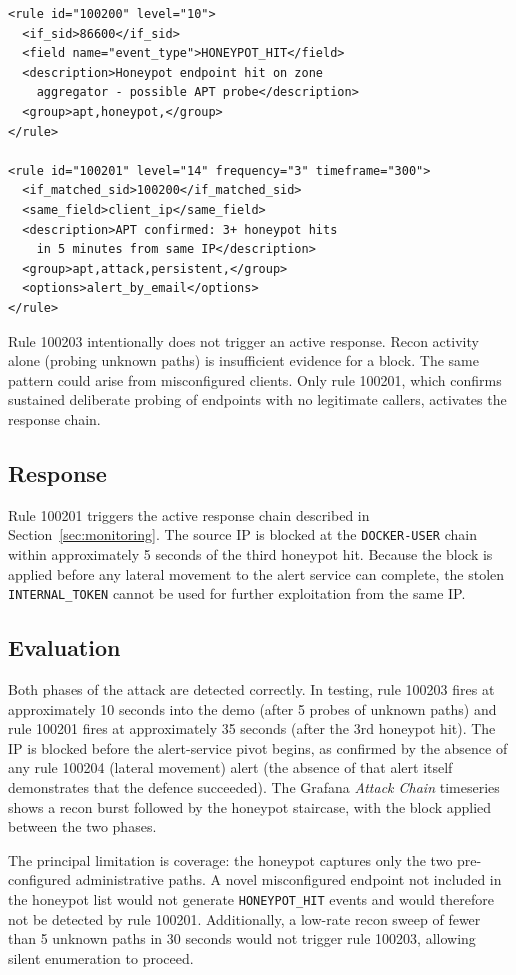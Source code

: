 \begin{lstlisting}[style=xmlstyle, caption={Wazuh rules for APT honeypot detection.}]
<rule id="100200" level="10">
  <if_sid>86600</if_sid>
  <field name="event_type">HONEYPOT_HIT</field>
  <description>Honeypot endpoint hit on zone
    aggregator - possible APT probe</description>
  <group>apt,honeypot,</group>
</rule>

<rule id="100201" level="14" frequency="3" timeframe="300">
  <if_matched_sid>100200</if_matched_sid>
  <same_field>client_ip</same_field>
  <description>APT confirmed: 3+ honeypot hits
    in 5 minutes from same IP</description>
  <group>apt,attack,persistent,</group>
  <options>alert_by_email</options>
</rule>
\end{lstlisting}

Rule 100203 intentionally does not trigger an active response. Recon activity
alone (probing unknown paths) is insufficient evidence for a block. The same
pattern could arise from misconfigured clients. Only rule 100201, which confirms
sustained deliberate probing of endpoints with no legitimate callers, activates
the response chain.

\subsection{Response}

Rule 100201 triggers the active response chain described in
Section~\ref{sec:monitoring}. The source IP is blocked at the
\texttt{DOCKER-USER} chain within approximately 5 seconds of the third honeypot
hit. Because the block is applied before any lateral movement to the alert
service can complete, the stolen \texttt{INTERNAL\_TOKEN} cannot be used for
further exploitation from the same IP.

\subsection{Evaluation}

Both phases of the attack are detected correctly. In testing, rule 100203 fires
at approximately 10 seconds into the demo (after 5 probes of unknown paths) and
rule 100201 fires at approximately 35 seconds (after the 3rd honeypot hit). The
IP is blocked before the alert-service pivot begins, as confirmed by the absence
of any rule 100204 (lateral movement) alert (the absence of that alert itself
demonstrates that the defence succeeded). The Grafana \emph{Attack Chain} timeseries
shows a recon burst followed by the honeypot staircase, with the block applied
between the two phases.

The principal limitation is coverage: the honeypot captures only the two
pre-configured administrative paths. A novel misconfigured endpoint not included
in the honeypot list would not generate \texttt{HONEYPOT\_HIT} events and would
therefore not be detected by rule 100201. Additionally, a low-rate recon sweep
of fewer than 5 unknown paths in 30 seconds would not trigger rule 100203, allowing
silent enumeration to proceed.
